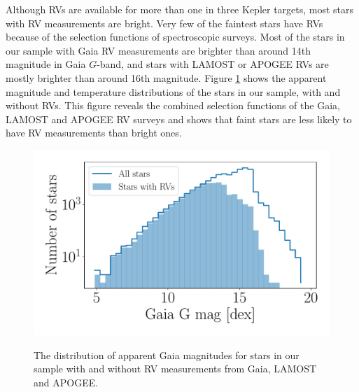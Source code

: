Although RVs are available for more than one in three Kepler targets, most
stars with RV measurements are bright.
Very few of the faintest stars have RVs because of the selection functions of
spectroscopic surveys.
Most of the stars in our sample with Gaia RV measurements are brighter than
around 14th magnitude in Gaia $G$-band, and stars with LAMOST or APOGEE RVs
are mostly brighter than around 16th magnitude.
Figure \ref{fig:rv_histogram} shows the apparent magnitude and temperature
distributions of the stars in our sample, with and without RVs.
This figure reveals the combined selection functions of the Gaia, LAMOST and
APOGEE RV surveys and shows that faint stars are less likely to have RV
measurements than bright ones.
\begin{figure}[ht!]
\caption{
    The distribution of apparent Gaia magnitudes for
    stars in our sample with and without RV measurements from Gaia, LAMOST and
    APOGEE.
}
  \centering \includegraphics[width=.5\textwidth]{rv_histogram}
\label{fig:rv_histogram}
\end{figure}

